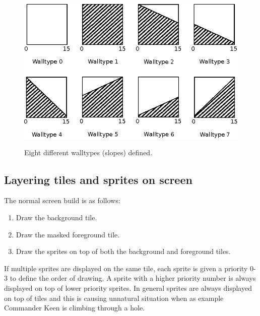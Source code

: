 \documentclass[book.tex]{subfiles}
\begin{document}
\begin{minipage}{\textwidth}
  
\end{minipage}
\label{wallclip_array}
\par
\begin{figure}[H]
  \centering
  \includegraphics[width=\textwidth]{imgs/drawings/walltype.eps}
  \label{fig:walltype}
  \caption{Eight different walltypes (slopes) defined.}
\end{figure}



\par
\begin{minipage}{\textwidth}
  
\end{minipage}
\label{wallclip_array}
\par

\subsection{Layering tiles and sprites on screen}
The normal screen build is as follows:
\begin{enumerate}
  \item Draw the background tile.
  \item Draw the masked foreground tile.
  \item Draw the sprites on top of both the background and foreground tiles.
\end{enumerate}

If multiple sprites are displayed on the same tile, each sprite is given a priority 0-3 to define the order of drawing. A sprite with a higher priority number is always displayed on top of lower priority sprites. In general sprites are always displayed on top of tiles and this is causing unnatural situation when as example Commander Keen is climbing through a  hole.\\
\end{document}
